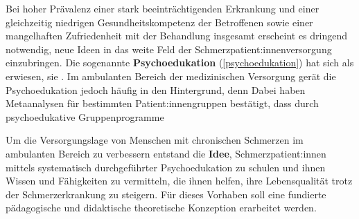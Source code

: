 \documentclass[
  twoside,
  parskip=half-,
  paper=176mm:246mm,
  BCOR=14mm,
  DIV=14,
]{scrreprt}
\begin{document}
    Bei hoher Prävalenz einer stark beeinträchtigenden Erkrankung und einer gleichzeitig niedrigen Gesundheitskompetenz der Betroffenen sowie einer mangelhaften Zufriedenheit mit der Behandlung insgesamt erscheint es dringend notwendig, neue Ideen in das weite Feld der Schmerzpatient:innenversorgung einzubringen. Die sogenannte \textbf{Psychoedukation} (\autoref{psychoedukation}) hat sich als  erwiesen, sie . Im ambulanten Bereich der medizinischen Versorgung gerät die Psychoedukation jedoch häufig in den Hintergrund, denn   Dabei haben Metaanalysen für bestimmten Patient:innengruppen bestätigt, dass durch psychoedukative Gruppenprogramme  

    Um die Versorgungslage von Menschen mit chronischen Schmerzen im ambulanten Bereich zu verbessern entstand die \textbf{Idee}, Schmerzpatient:innen mittels systematisch durchgeführter Psychoedukation zu schulen und ihnen Wissen und Fähigkeiten zu vermitteln, die ihnen helfen, ihre Lebensqualität trotz der Schmerzerkrankung zu steigern. Für dieses Vorhaben soll eine fundierte pädagogische und didaktische theoretische Konzeption erarbeitet werden.
    
\end{document}
